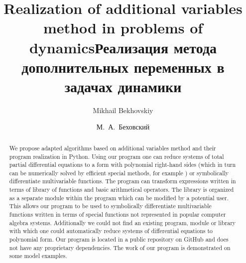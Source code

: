 \begin{englishtitle} %
\title{Realization of additional variables method in problems of dynamics}
\author{Mikhail Bekhovskiy}

\maketitle

\begin{abstract}
We propose adapted algorithms based on additional variables method \cite{AlgoDE,AlgoFunc,AVM} and their program realization in Python. Using our program one can reduce systems of total partial differential equations to a form with polynomial right-hand sides (which in turn can be numerically solved by efficient special methods, for example \cite{TSM}) or symbolically differentiate multivariable functions. The program can transform expressions written in terms of library of functions and basic arithmetical operators. The library is organized as a separate module within the program which can be modified by a potential user. This allows our program to be used to symbolically differentiate multivariable functions written in terms of special functions not represented in popular computer algebra systems. Additionally we could not find an existing program, module or library with which one could automatically reduce systems of differential equations to polynomial form.
Our program is located in a public repository on GitHub \cite{repo} and does not have any proprietary dependencies.
The work of our program is demonstrated on some model examples.

\end{abstract}
\end{englishtitle}


\title{Реализация метода дополнительных переменных в задачах динамики}
\author{М.~А.~Беховский}



